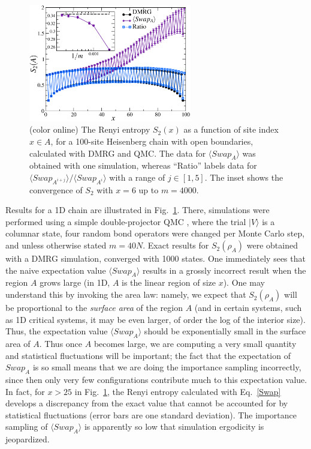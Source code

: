 \documentclass[prl,aps,twocolumn,floatfix,amsmath,amssymb,superscriptaddress,tightenlines]{revtex4}
\begin{document}
\begin{figure} {
\includegraphics[width=2.8in]{L100_fig2.eps} \caption{(color online) 
\label{1Dfig}
The Renyi entropy $S_2(x)$ as a function of site index $x \in A$, for a 100-site Heisenberg chain with open boundaries, 
calculated with DMRG and QMC.  The data for $\langle Swap_A \rangle$ was obtained with one simulation, whereas ``Ratio'' labels data for 
${\langle Swap_{A^{i+j}}\rangle}/{\langle Swap_{A^{i}}\rangle}$
with a range of  $j \in [1,5]$.  The inset shows the convergence of $S_2$ with $x=6$ up to $m=4000$.
}
} \end{figure}

Results for a 1D chain are illustrated in Fig.~\ref{1Dfig}.  There, simulations were performed using a simple double-projector QMC \cite{Sandvik}, where
the trial $| V \rangle$ is a columnar state, four random bond operators were changed per Monte Carlo step, and unless otherwise
stated $m=40N$.  Exact results for $S_2(\rho_A)$ were obtained with a DMRG simulation, converged with 1000 states.  One 
immediately sees that the naive expectation value $\langle Swap_A \rangle$ results in a grossly incorrect result when the region
$A$ grows large (in 1D, $A$ is the linear region of size $x$).   
One may understand this by invoking the area law: namely,
we expect
that $S_2(\rho_A)$ will be proportional to the {\it surface area} of the region
$A$ (and in certain systems, such as 1D critical systems, it
may be even larger, of order the log of the interior size).  Thus,
the expectation value $\langle Swap_A \rangle$ should be exponentially small in the
surface area of $A$.  Thus once $A$ becomes
large, we are computing a very small quantity and
statistical fluctuations will be important;
the fact that the expectation
of $Swap_A$ is so small means that we are doing the importance sampling
incorrectly, since then only very few configurations contribute much to this
expectation value.
In fact, for $x > 25$ in Fig.~\ref{1Dfig}, the Renyi entropy calculated with Eq.~\eqref{Swap} develops a discrepancy from the
exact value that cannot be accounted for by statistical fluctuations (error bars are one standard deviation).  The importance
sampling of $\langle Swap_A \rangle$ is apparently so low that simulation ergodicity is jeopardized. 
\end{document}
